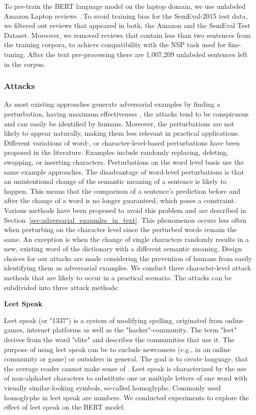 To pre-train the BERT language model on the laptop domain, we use unlabeled Amazon Laptop reviews \cite{he2016ups}. To avoid training bias for the SemEval-2015 test data, we filtered out reviews that appeared in both, the Amazon and the SemEval Test Dataset. Moreover, we removed reviews that contain less than two sentences from the training corpora, to achieve compatibility with the NSP task used for fine-tuning. After the text pre-processing there are 1,007,209 unlabeled sentences left in the corpus. 


\subsubsection{Attacks}
\label{sec:attacks_method}
As most existing approaches generate adversarial examples by finding a perturbation, having maximum effectiveness \cite{liang2017deep, ebrahimi2017hotflip, gao2018black, li2018textbugger, alzantot2018generating, jin2019bert, garg2020bae}, the attacks tend to be conspicuous and can easily be identified by humans. Moreover, the perturbations are not likely to appear naturally, making them less relevant in practical applications. Different variations of word-, or character-level-based perturbations have been proposed in the literature. 
Examples include randomly replacing, deleting, swapping, or inserting characters. Perturbations on the word level basis use the same example approaches.  
The disadvantage of word-level perturbations is that an unintentional change of the semantic meaning of a sentence is likely to happen. This means that the comparison of a sentence's prediction before and after the change of a word is no longer guaranteed, which poses a constraint. Various methods have been proposed to avoid this problem and are described in Section~\ref{sec:adversarial_exapmles_in_text}. 
This phenomenon occurs less often when perturbing on the character level since the perturbed words remain the same. An exception is when the change of single characters randomly results in a new, existing word of the dictionary with a different semantic meaning. 
Design choices for our attacks are made considering the prevention of humans from easily identifying them as adversarial examples.
We conduct three character-level attack methods that are likely to occur in a practical scenario. The attacks can be subdivided into three attack methods:


\textbf{Leet Speak}

Leet speak (or "1337") is a system of modifying spelling, originated from online games, internet platforms as well as the "hacker"-community. The term "leet" derives from the word "elite" and describes the communities that use it. The purpose of using leet speak can be to exclude newcomers (e.g., in an online community or game) or outsiders in general. The goal is to create language, that the average reader cannot make sense of \cite{thomas2002hacker}.
Leet speak is characterized by the use of non-alphabet characters to substitute one or multiple letters of one word with visually similar-looking symbols, so-called homoglyphs. Commonly used homoglyphs in leet speak are numbers. 
We conducted experiments to explore the effect of leet speak on the BERT model. 

